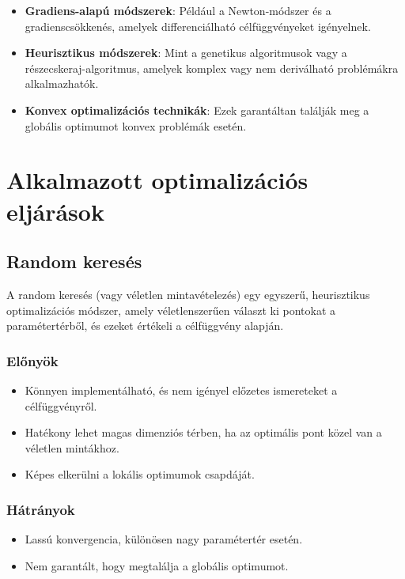 \begin{itemize}
    \item \textbf{Gradiens-alapú módszerek}: Például a Newton-módszer és a gradienscsökkenés, amelyek differenciálható célfüggvényeket igényelnek.
    \item \textbf{Heurisztikus módszerek}: Mint a genetikus algoritmusok vagy a részecskeraj-algoritmus, amelyek komplex vagy nem deriválható problémákra alkalmazhatók.
    \item \textbf{Konvex optimalizációs technikák}: Ezek garantáltan találják meg a globális optimumot konvex problémák esetén.
\end{itemize}

\section{Alkalmazott optimalizációs eljárások}
\subsection{Random keresés}
A random keresés (vagy véletlen mintavételezés) egy egyszerű, heurisztikus optimalizációs módszer, amely véletlenszerűen választ ki pontokat a paramétertérből, és ezeket értékeli a célfüggvény alapján.

\subsubsection{Előnyök}
\begin{itemize}
    \item Könnyen implementálható, és nem igényel előzetes ismereteket a célfüggvényről.
    \item Hatékony lehet magas dimenziós térben, ha az optimális pont közel van a véletlen mintákhoz.
    \item Képes elkerülni a lokális optimumok csapdáját.
\end{itemize}

\subsubsection{Hátrányok}
\begin{itemize}
    \item Lassú konvergencia, különösen nagy paramétertér esetén.
    \item Nem garantált, hogy megtalálja a globális optimumot.
\end{itemize}

